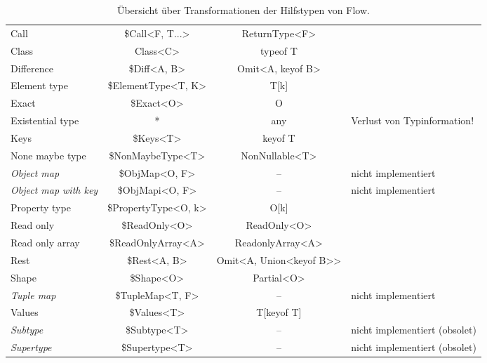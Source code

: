 \begin{table}[tbh]
  \footnotesize
  \begin{tabu} to 
    \midrule
        &      &  &  \\
    \midrule
    Call                         &  \$Call<F, T...>        & ReturnType<F>            & {} \\
    Class                        &  Class<C>               & typeof T                 & {} \\
    Difference                   &  \$Diff<A, B>           & Omit<A, keyof B>         & {} \\
    Element type                 &  \$ElementType<T, K>    & T[k]                     & {} \\
    Exact                        &  \$Exact<O>             & O                        & {} \\
    Existential type             &  *                      & any                      & Verlust von Typinformation! \\
    Keys                         &  \$Keys<T>              & keyof T                  & {} \\
    None maybe type              &  \$NonMaybeType<T>      & NonNullable<T>           & {} \\
    \textit{Object map}          &  \$ObjMap<O, F>         & --                       & nicht implementiert \\
    \textit{Object map with key} &  \$ObjMapi<O, F>        & --                       & nicht implementiert \\
    Property type                &  \$PropertyType<O, k>   & O[k]                     & {} \\
    Read only                    &  \$ReadOnly<O>          & ReadOnly<O>              & {} \\
    Read only array              &  \$ReadOnlyArray<A>     & ReadonlyArray<A>         & {} \\
    Rest                         &  \$Rest<A, B>           & Omit<A, Union<keyof B>>  & {} \\
    Shape                        &  \$Shape<O>             & Partial<O>               & {} \\
    \textit{Tuple map}           &  \$TupleMap<T, F>       & --                       & nicht implementiert \\
    Values                       &  \$Values<T>            & T[keyof T]               & {} \\
    \textit{Subtype}             &  \$Subtype<T>           & --                       & nicht implementiert (obsolet) \\
    \textit{Supertype}           &  \$Supertype<T>         & --                       & nicht implementiert (obsolet) \\
    \midrule
  \end{tabu}
  \caption{Übersicht über Transformationen der Hilfstypen von Flow.}
  \label{tab:transformation-utility-types}
\end{table}
